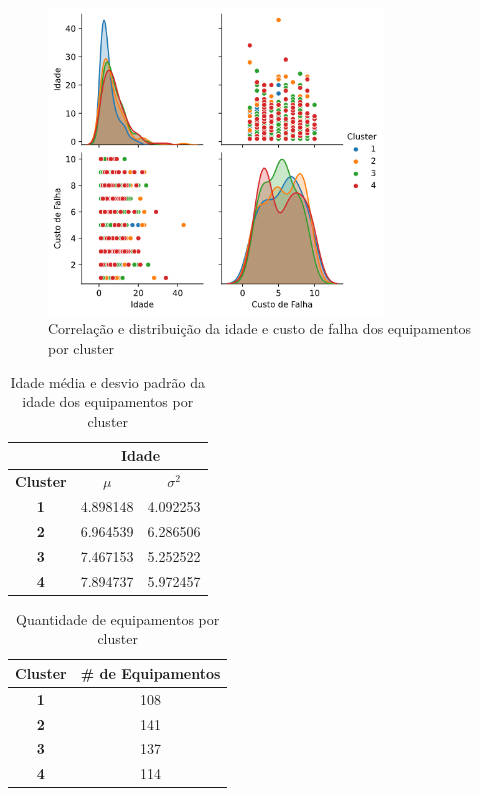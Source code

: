 \documentclass[conference]{IEEEtran}
\begin{document}
\begin{figure}[h!]
	\centering
	\includegraphics[width=3.5in]{figEquipDB.png}
	\caption{Correlação e distribuição da idade e custo de falha dos equipamentos por cluster}
	\label{fig:figEquipDB}
\end{figure}

\begin{table}[h!]
	\caption{Idade média e desvio padrão da idade dos equipamentos por cluster}
	\label{tb:equipDB}
	\centering
	\begin{tabular}{c|c|c|}
		\cline{2-3}
		\multicolumn{1}{l|}{\textbf{}}         & \multicolumn{2}{c|}{\textbf{Idade}}  \\ \hline
		\multicolumn{1}{|c|}{\textbf{Cluster}} & \textbf{$\mu$} & \textbf{$\sigma^2$} \\ \hline
		\multicolumn{1}{|c|}{\textbf{1}}       & 4.898148       & 4.092253            \\ \hline
		\multicolumn{1}{|c|}{\textbf{2}}       & 6.964539       & 6.286506            \\ \hline
		\multicolumn{1}{|c|}{\textbf{3}}       & 7.467153       & 5.252522            \\ \hline
		\multicolumn{1}{|c|}{\textbf{4}}       & 7.894737       & 5.972457            \\ \hline
	\end{tabular}
\end{table}

\begin{table}[h!]
	\centering
	\caption{Quantidade de equipamentos por cluster}
	\label{tab:cluster_equip}
	\begin{tabular}{|c|c|}
		\hline
		\textbf{Cluster} & \textbf{\# de Equipamentos} \\ \hline
		\textbf{1}                & 108                         \\ \hline
		\textbf{2}                & 141                         \\ \hline
		\textbf{3}               & 137                         \\ \hline
		\textbf{4}               & 114                         \\ \hline
	\end{tabular}
\end{table}
\end{document}
